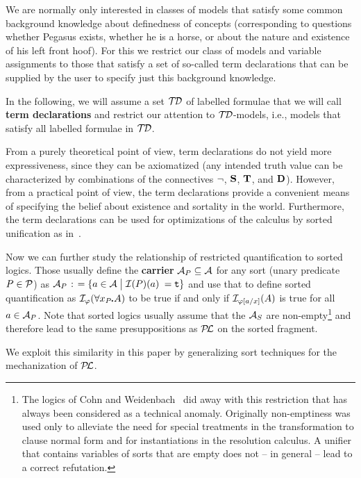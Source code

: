 \documentclass{\filespath jancl}
\def\setdivider{\;\bigl|\;}
\def\deq{{\;\colon\kern-.2em=\;}}
\def\phi{\varphi}
\def\cA{{\cal A}}\def\cB{{\cal B}}\def\cC{{\cal C}}
\let\phi\varphi
\def\sdot{\rule{.3ex}{.3ex}\hspace{-0.4ex}\;}
\newcommand{\true}{{\tt t}}
\def\presuppl{{\cal P\kern-.4ex L}}
\def\Preds{{\cal P}}
\def\tf{{\bf D}}
\def\holds{{\bf T}}
\def\deft{{\bf S}}
\def\TermDecs{\cal T\kern-.3ex D}
\begin{document}
We are normally only interested in classes of models that satisfy some common
background knowledge about definedness of concepts (corresponding to
questions whether Pegasus exists, whether he is a horse, or about the nature
and existence of his left front hoof). For this we restrict our class of
models and variable assignments to those that satisfy a set of so-called term
declarations that can be supplied by the user to specify just this background
knowledge.

\begin{definition}\label{Def:termdec}
  In the following, we will assume a set $\TermDecs$ of labelled
  formulae that we will call {\bf term declarations} and restrict our
  attention to $\TermDecs$-models, i.e., models that satisfy all labelled
  formulae in $\TermDecs$.
\end{definition}

{}From a purely theoretical point of view, term declarations do not yield more
expressiveness, since they can be axiomatized (any intended truth value can be
characterized by combinations of the connectives $\neg$, $\deft$,
$\holds$, and $\tf$).  However, from a practical point of view, the term
declarations provide a convenient means of specifying the belief about
existence and sortality in the world. Furthermore, the term declarations can
be used for optimizations of the calculus by sorted unification as
in~\cite{KeKo:atcfpf96}.

  
\begin{remark}
  Now we can further study the relationship of restricted quantification
  to sorted logics. Those usually define the {\bf carrier}
  $\cA_P\subseteq\cA$ for any sort (unary predicate $P\in\Preds$) as
  $\cA_P\deq\{a\in\cA\setdivider\cI(P)(a)$ $=\true\}$ and use that to
  define sorted quantification as $\cI_\phi(\forall x_P\sdot A)$ to be
  true if and only if $\cI_{\phi[a/x]}(A)$ is true for all $a\in\cA_P$. Note
  that sorted logics usually assume that the $\cA_S$ are
  non-empty\footnote{The logics of Cohn and
    Weidenbach~\cite{Cohn87,Weidenbach91} did away with this
    restriction that has always been considered as a technical anomaly. Originally
    non-emptiness was used only to alleviate the need for special treatments in the
    transformation to clause normal form and for instantiations in the
    resolution calculus. A unifier that contains variables of sorts
    that are empty does not -- in general --  lead to a correct refutation.} and
  therefore lead to the same presuppositions as $\presuppl$ on the
  sorted fragment.

  We exploit this similarity in this paper by generalizing sort techniques for
  the mechanization of $\presuppl$. 
\end{remark}
\end{document}
